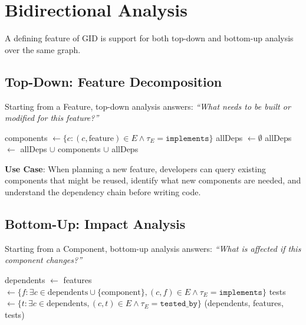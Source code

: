 \documentclass[11pt,a4paper]{article}
\begin{document}
\section{Bidirectional Analysis}

A defining feature of GID is support for both top-down and bottom-up analysis over the same graph.

\subsection{Top-Down: Feature Decomposition}

Starting from a Feature, top-down analysis answers: \emph{``What needs to be built or modified for this feature?''}

\begin{algorithm}[h]
\caption{Feature Decomposition}
\begin{algorithmic}[1]
    \State components $\gets \{c : (c, \text{feature}) \in E \land \tau_E = \texttt{implements}\}$
    \State allDeps $\gets \emptyset$
        \State allDeps $\gets$ allDeps $\cup$ 
    \EndFor
    \State \Return components $\cup$ allDeps
\EndFunction
\end{algorithmic}
\end{algorithm}

\textbf{Use Case}: When planning a new feature, developers can query existing components that might be reused, identify what new components are needed, and understand the dependency chain before writing code.

\subsection{Bottom-Up: Impact Analysis}

Starting from a Component, bottom-up analysis answers: \emph{``What is affected if this component changes?''}

\begin{algorithm}[h]
\caption{Impact Analysis}
\begin{algorithmic}[1]
    \State dependents $\gets$ 
    \State features $\gets \{f : \exists c \in \text{dependents} \cup \{\text{component}\}, (c, f) \in E \land \tau_E = \texttt{implements}\}$
    \State tests $\gets \{t : \exists c \in \text{dependents}, (c, t) \in E \land \tau_E = \texttt{tested\_by}\}$
    \State \Return (dependents, features, tests)
\EndFunction
\end{algorithmic}
\end{algorithm}
\end{document}
